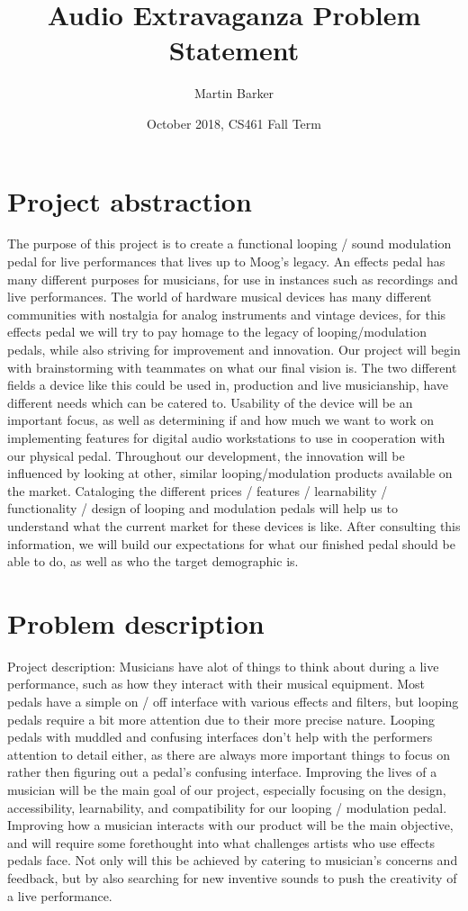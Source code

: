 \documentclass{article}
\title{Audio Extravaganza Problem Statement}
\author{Martin Barker}
\date{October 2018, CS461 Fall Term}
\begin{document}
\maketitle

\section{Project abstraction}
The purpose of this project is to create a functional looping / sound modulation pedal for live performances that lives up to Moog's legacy. An effects pedal has many different purposes for musicians, for use in instances such as recordings and live performances. The world of hardware musical devices has many different communities with nostalgia for analog instruments and vintage devices, for this effects pedal we will try to pay homage to the legacy of looping/modulation pedals, while also striving for improvement and innovation. Our project will begin with brainstorming with teammates on what our final vision is. The two different fields a device like this could be used in, production and live musicianship, have different needs which can be catered to. Usability of the device will be an important focus, as well as determining if and how much we want to work on implementing features for digital audio workstations to use in cooperation with our physical pedal. Throughout our development, the innovation will be influenced by looking at other, similar looping/modulation products available on the market. Cataloging the different prices / features / learnability / functionality / design of looping and modulation pedals will help us to understand what the current market for these devices is like. After consulting this information, we will build our expectations for what our finished pedal should be able to do, as well as who the target demographic is. 




\section{Problem description}
Project description:
Musicians have alot of things to think about during a live performance, such as how they interact with their musical equipment. Most pedals have a simple on / off interface with various effects and filters, but looping pedals require a bit more attention due to their more precise nature. Looping pedals with muddled and confusing interfaces don't help with the performers attention to detail either, as there are always more important things to focus on rather then figuring out a pedal's confusing interface. Improving the lives of a musician will be the main goal of our project, especially focusing on the design, accessibility, learnability, and compatibility for our looping / modulation pedal. Improving how a musician interacts with our product will be the main objective, and will require some forethought into what challenges artists who use effects pedals face. Not only will this be achieved by catering to musician's concerns and feedback, but by also searching for new inventive sounds to push the creativity of a live performance. 
\end{document}
